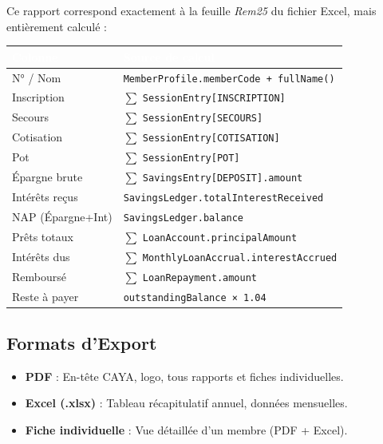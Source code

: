 \documentclass[12pt, a4paper]{report}
\begin{document}
Ce rapport correspond exactement à la feuille \textit{Rem25} du fichier Excel, mais entièrement calculé :

\begin{center}
\small
{}
\begin{tabular}{L{4cm}L{9cm}}
  \toprule
  \textcolor{white}{\textbf{Colonne}} &
  \textcolor{white}{\textbf{Source de calcul}} \\
  \midrule
  N° / Nom          & \texttt{MemberProfile.memberCode + fullName()} \\
  Inscription       & $\sum$ \texttt{SessionEntry[INSCRIPTION]} \\
  Secours           & $\sum$ \texttt{SessionEntry[SECOURS]} \\
  Cotisation        & $\sum$ \texttt{SessionEntry[COTISATION]} \\
  Pot               & $\sum$ \texttt{SessionEntry[POT]} \\
  Épargne brute     & $\sum$ \texttt{SavingsEntry[DEPOSIT].amount} \\
  Intérêts reçus    & \texttt{SavingsLedger.totalInterestReceived} \\
  NAP (Épargne+Int) & \texttt{SavingsLedger.balance} \\
  Prêts totaux      & $\sum$ \texttt{LoanAccount.principalAmount} \\
  Intérêts dus      & $\sum$ \texttt{MonthlyLoanAccrual.interestAccrued} \\
  Remboursé         & $\sum$ \texttt{LoanRepayment.amount} \\
  Reste à payer     & \texttt{outstandingBalance × 1.04} \\
  \bottomrule
\end{tabular}
\end{center}

\subsection{Formats d'Export}

\begin{itemize}
  \item \textbf{PDF} : En-tête CAYA, logo, tous rapports et fiches individuelles.
  \item \textbf{Excel (.xlsx)} : Tableau récapitulatif annuel, données mensuelles.
  \item \textbf{Fiche individuelle} : Vue détaillée d'un membre (PDF + Excel).
\end{itemize}
\end{document}
